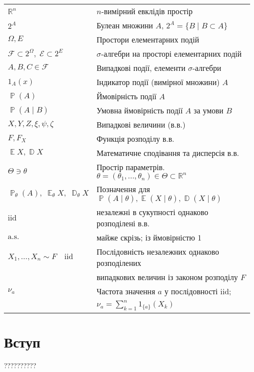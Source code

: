 \documentclass{thesis}
\newcommand{\E}{\operatorname{\mathbb E}}
\newcommand{\D}{\operatorname{\mathbb D}}
\renewcommand{\P}{\operatorname{\mathbb P}}
\begin{document}
\bigskip


\begin{tabular}{ll}
$\mathbb R^n$ & $n$-вимірний евклідів простір\\[1mm]
$2^A$ & Булеан множини $A$, $2^A = \{B \mid B \subset A\}$ \\
$\Omega, E$ & Простори елементарних подій \\
$\mathcal F \subset 2^\Omega, \; \mathcal E \subset 2^E$ & $\sigma$-алгебри на просторі елементарних подій \\
$A, B, C \in \mathcal F$ & Випадкові події, елементи $\sigma$-алгебри \\
$1_A(x)$ & Індикатор події (вимірної множини) $A$ \\
$\P(A)$ & Ймовірність події $A$ \\
$\P(A\mid B)$ & Умовна ймовірність події $A$ за умови $B$ \\
$X, Y, Z, \xi, \psi, \zeta$ & Випадкові величини (в.в.) \\
$F, F_X$ & Функція розподілу в.в. \\
$\E X, \D X$ & Математичне сподівання та дисперсія в.в. \\
$\Theta \ni \theta$ & Простір параметрів. $\theta = (\theta_1, ..., \theta_n) \in \Theta \subset \mathbb R^n$ \\
$\P_\theta(A),\;\E_\theta X,\;\D_\theta X$ & Позначення для $\P(A\mid \theta), \E(X \mid \theta), \D( X \mid \theta)$ \\
$\text{iid}$ & незалежні в сукупності однаково розподілені в.в. \\
$\text{a.s.}$ & майже скрізь; із ймовірністю 1 \\
$X_1, ..., X_n \sim F \quad \text{iid}$ & Послідовність незалежних однаково розподілених \\
~ & випадкових величин із законом розподілу $F$ \\
$\nu_a$ & Частота значення $a$ у послідовності iid; \\
~ & $\nu_a = \sum_{k=1}^n 1_{\{a\}}(X_k)$ \\

\end{tabular}


\newpage

\chapter*{Вступ}\label{Introduction}

??????????
\cite{boyko-thesis,boyko2021,PopovychBoykoNesterenkoLutfullin2003}
\end{document}
